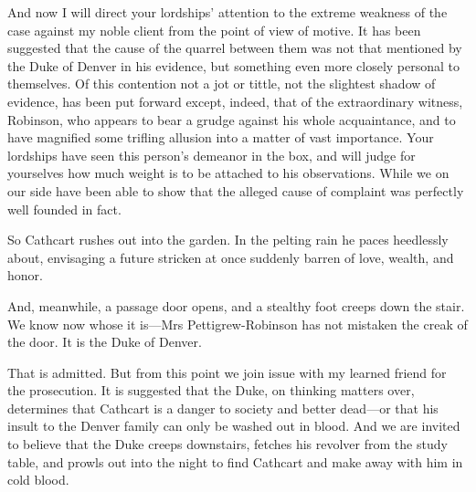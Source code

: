 \begin{dialogue}
\smallskip 

And now I will direct your lordships' attention to the extreme weakness of the case against my noble client from the point of view of motive. It has been suggested that the cause of the quarrel between them was not that mentioned by the Duke of Denver in his evidence, but something even more closely personal to themselves. Of this contention not a jot or tittle, not the slightest shadow of evidence, has been put forward except, indeed, that of the extraordinary witness, Robinson, who appears to bear a grudge against his whole acquaintance, and to have magnified some trifling allusion into a matter of vast importance. Your lordships have seen this person's demeanor in the box, and will judge for yourselves how much weight is to be attached to his observations. While we on our side have been able to show that the alleged cause of complaint was perfectly well founded in fact.

\smallskip 

So Cathcart rushes out into the garden. In the pelting rain he paces heedlessly about, envisaging a future stricken at once suddenly barren of love, wealth, and honor.

\smallskip 

And, meanwhile, a passage door opens, and a stealthy foot creeps down the stair. We know now whose it is\allowbreak---\allowbreak Mrs Pettigrew-Robinson has not mistaken the creak of the door. It is the Duke of Denver.

\smallskip 

That is admitted. But from this point we join issue with my learned friend for the prosecution. It is suggested that the Duke, on thinking matters over, determines that Cathcart is a danger to society and better dead\allowbreak---\allowbreak or that his insult to the Denver family can only be washed out in blood. And we are invited to believe that the Duke creeps downstairs, fetches his revolver from the study table, and prowls out into the night to find Cathcart and make away with him in cold blood.

\smallskip 


\end{dialogue}
